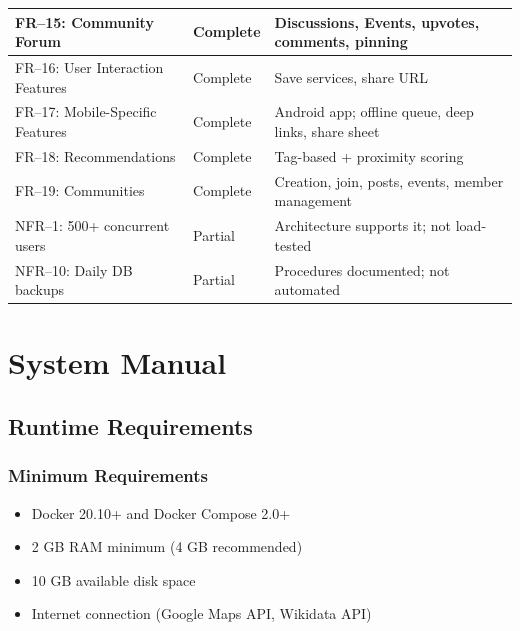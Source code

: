 \documentclass[10pt,a4paper]{report}
\begin{document}
\begin{longtable}{|p{5.5cm}|p{2cm}|p{6cm}|}
    \hline
    FR--15: Community Forum              & Complete          & Discussions, Events, upvotes, comments, pinning            \\
    \hline
    FR--16: User Interaction Features    & Complete          & Save services, share URL                                   \\
    \hline
    FR--17: Mobile-Specific Features     & Complete          & Android app; offline queue, deep links, share sheet        \\
    \hline
    FR--18: Recommendations              & Complete          & Tag-based + proximity scoring                              \\
    \hline
    FR--19: Communities                  & Complete          & Creation, join, posts, events, member management           \\
    \hline
    NFR--1: 500+ concurrent users        & Partial           & Architecture supports it; not load-tested                  \\
    \hline
    NFR--10: Daily DB backups            & Partial           & Procedures documented; not automated                       \\
    \hline
\end{longtable}

\chapter{System Manual}

\section{Runtime Requirements}

\subsection{Minimum Requirements}

\begin{itemize}
    \item Docker 20.10+ and Docker Compose 2.0+
    \item 2 GB RAM minimum (4 GB recommended)
    \item 10 GB available disk space
    \item Internet connection (Google Maps API, Wikidata API)
\end{itemize}
\end{document}
